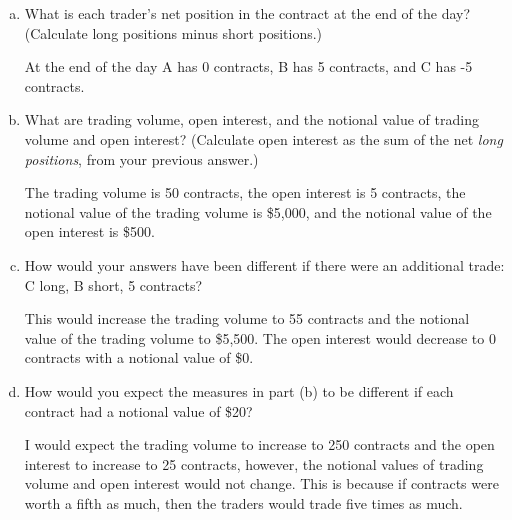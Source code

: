 \documentclass[12pt]{article}
\theoremstyle{plain}
\begin{document}
\begin{enumerate}[(a)]
\item What is each trader's net position in the contract at the end of the day? (Calculate long positions minus short positions.)

At the end of the day A has 0 contracts, B has 5 contracts, and C has -5 contracts.

\item What are trading volume, open interest, and the notional value of trading volume and open interest? (Calculate open interest as the sum of the net \emph{long positions}, from your previous answer.)

The trading volume is 50 contracts, the open interest is 5 contracts, the notional value of the trading volume is \$5,000, and the notional value of the open interest is \$500.

\item How would your answers have been different if there were an additional trade: C long, B short, 5 contracts?

This would increase the trading volume to 55 contracts and the notional value of the trading volume to \$5,500. The open interest would decrease to 0 contracts with a notional value of \$0.

\item How would you expect the measures in part (b) to be different if each contract had a notional value of \$20?

I would expect the trading volume to increase to 250 contracts and the open interest to increase to 25 contracts, however, the notional values of trading volume and open interest would not change. This is because if contracts were worth a fifth as much, then the traders would trade five times as much.
\end{enumerate}
\end{document}
